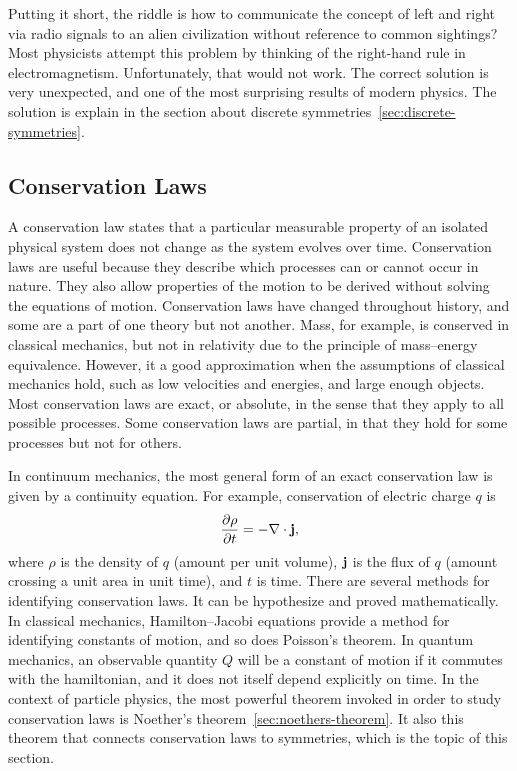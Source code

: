 Putting it short, the riddle is how to communicate the concept of left and right via radio signals to an alien civilization without reference to common sightings? Most physicists attempt this problem by thinking of the right-hand rule in electromagnetism. Unfortunately, that would not work. The correct solution is very unexpected, and one of the most surprising results of modern physics. The solution is explain in the section about discrete symmetries~\ref{sec:discrete-symmetries}.

\subsection{Conservation Laws}

A conservation law states that a particular measurable property of an isolated physical system does not change as the system evolves over time. Conservation laws are useful because they describe which processes can or cannot occur in nature. They also allow properties of the motion to be derived without solving the equations of motion. Conservation laws have changed throughout history, and some are a part of one theory but not another. Mass, for example, is conserved in classical mechanics, but not in relativity due to the principle of mass–energy equivalence. However, it a good approximation when the assumptions of classical mechanics hold, such as low velocities and energies, and large enough objects. Most conservation laws are exact, or absolute, in the sense that they apply to all possible processes. Some conservation laws are partial, in that they hold for some processes but not for others.

In continuum mechanics, the most general form of an exact conservation law is given by a continuity equation. For example, conservation of electric charge $q$ is
\begin{equation}
\pdv{\rho}{t}=-\nabla\cdot\vb{j},
\end{equation}
where $\rho$ is the density of $q$ (amount per unit volume), $\vb{j}$ is the flux of $q$ (amount crossing a unit area in unit time), and $t$ is time. There are several methods for identifying conservation laws. It can be hypothesize and proved mathematically. In classical mechanics, Hamilton–Jacobi equations provide a method for identifying constants of motion, and so does Poisson's theorem. In quantum mechanics, an observable quantity $Q$ will be a constant of motion if it commutes with the hamiltonian, and it does not itself depend explicitly on time. In the context of particle physics, the most powerful theorem invoked in order to study conservation laws is Noether's theorem~\ref{sec:noethers-theorem}. It also this  theorem that connects conservation laws to symmetries, which is the topic of this section. 

